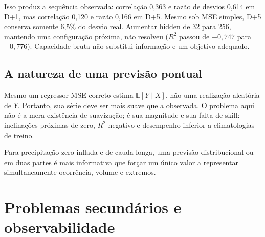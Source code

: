 \documentclass[11pt,a4paper]{article}
\begin{document}
Isso produz a sequência observada: correlação 0,363 e razão de desvios 0,614 em D+1, mas
correlação 0,120 e razão 0,166 em D+5. Mesmo sob MSE simples, D+5 conserva somente 6,5\% do
desvio real. Aumentar hidden de 32 para 256, mantendo uma configuração próxima, não resolveu
($R^2$ passou de $-0{,}747$ para $-0{,}776$). Capacidade bruta não substitui informação e um
objetivo adequado.

\subsection{A natureza de uma previsão pontual}

Mesmo um regressor MSE correto estima $\mathbb{E}[Y\mid X]$, não uma realização aleatória de
$Y$. Portanto, sua série deve ser mais suave que a observada. O problema aqui não é a mera
existência de suavização; é sua magnitude e sua falta de skill: inclinações próximas de zero,
$R^2$ negativo e desempenho inferior a climatologias de treino.

Para precipitação zero-inflada e de cauda longa, uma previsão distribucional ou em duas partes
é mais informativa que forçar um único valor a representar simultaneamente ocorrência, volume e
extremos.

\section{Problemas secundários e observabilidade}
\end{document}
